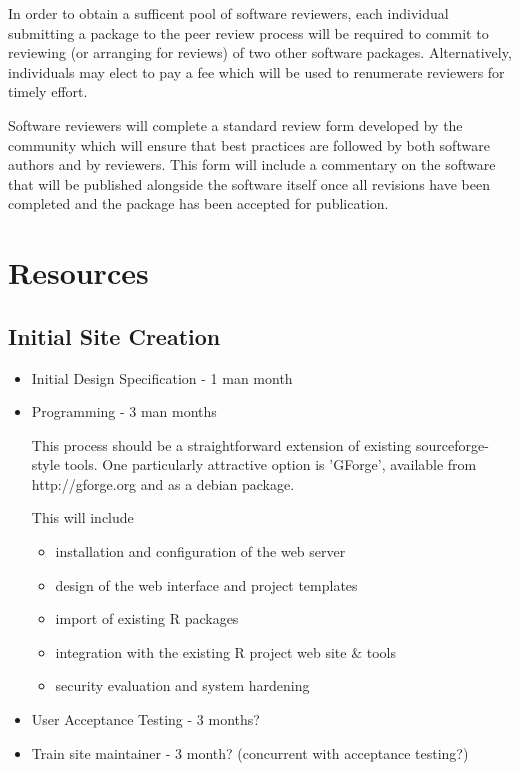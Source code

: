 \documentclass[12pt]{article}
\begin{document}
In order to obtain a sufficent pool of software reviewers, each
individual submitting a package to the peer review process will be
required to commit to reviewing (or arranging for reviews) of two
other software packages.  Alternatively, individuals may elect to pay
a fee which will be used to renumerate reviewers for timely effort.

Software reviewers will complete a standard review form developed by
the community which will ensure that best practices are followed by
both software authors and by reviewers.  This form will include a
commentary on the software that will be published alongside the
software itself once all revisions have been completed and the package
has been accepted for publication. 

\section{Resources}

\subsection{Initial Site Creation}

\begin{itemize}
\item Initial Design Specification - 1 man month

\item Programming - 3 man months
  
  This process should be a straightforward extension of existing
  sourceforge-style tools.  One particularly attractive option is
  'GForge', available from http://gforge.org and as a debian package.

  This will include 
  \begin{itemize}
  \item installation and configuration of the web server
  \item design of the web interface and project templates
  \item import of existing R packages
  \item integration with the existing R project web site & tools
  \item security evaluation and system hardening
  \end{itemize}
    
\item User Acceptance Testing - 3 months?

\item Train site maintainer - 3 month?  (concurrent with acceptance testing?)

\end{itemize}
\end{document}
